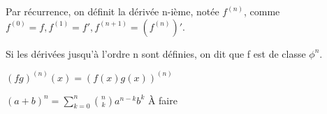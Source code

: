 \documentclass[a4paper, 12pt]{article}
\begin{document}
Par récurrence, on définit la dérivée n-ième, notée $f^{(n)}$, comme
$f^{(0)} = f, f^{(1)} = f', f^{(n+1)} = (f^{(n)})'$.

Si les dérivées jusqu'à l'ordre n sont définies, on dit que f est de classe $\phi^n$.

\begin{definition}
    $(fg)^{(n)}(x) = (f(x)g(x))^{(n)}$
\end{definition}

\begin{definition}
    $(a + b)^n = \sum_{k=0}^{n}\binom{n}{k}a^{n-k}b^k$
    À faire
\end{definition}
\end{document}
